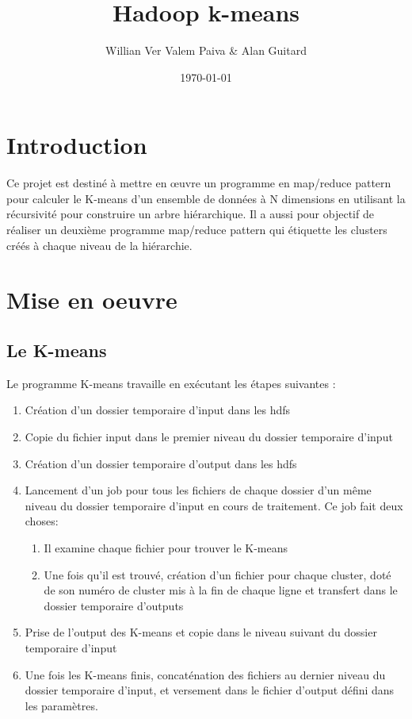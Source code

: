 \documentclass[12pt]{article}
\author{Willian Ver Valem Paiva \& Alan Guitard}
\date{\today}
\title{Hadoop k-means}
\begin{document}
\maketitle
\tableofcontents



\section{Introduction}
\label{sec:org2c21b8d}

Ce projet est destiné à mettre en œuvre un programme en map/reduce pattern pour calculer le K-means
d'un ensemble de données à N dimensions en utilisant la récursivité pour construire un arbre hiérarchique.
Il a aussi pour objectif de réaliser un deuxième programme  map/reduce pattern qui étiquette les clusters
créés à chaque niveau de la hiérarchie. 


\section{Mise en oeuvre}
\label{sec:orga0824aa}

\subsection{Le K-means}
\label{sec:org3d8c243}

Le programme K-means travaille en exécutant les étapes suivantes :

\begin{enumerate}
\item Création d'un dossier temporaire d'input dans les hdfs
\item Copie du fichier input dans le premier niveau du dossier temporaire d'input
\item Création d'un dossier temporaire d'output dans les hdfs
\item Lancement d'un job pour tous les fichiers de chaque dossier d'un même niveau du dossier temporaire d'input en cours de traitement. Ce job fait deux choses:  
\begin{enumerate}
\item Il examine chaque fichier pour trouver le K-means
\item Une fois qu'il est trouvé, création d'un fichier pour chaque cluster, doté de son numéro de cluster mis à la fin de chaque ligne et transfert dans le dossier temporaire d'outputs
\end{enumerate}
\item Prise de l'output des K-means et copie dans le niveau suivant du dossier temporaire d'input
\item Une fois les K-means finis, concaténation des fichiers au dernier niveau du dossier temporaire d'input, et versement dans le fichier
d'output défini dans les paramètres.
\end{enumerate}
\end{document}
